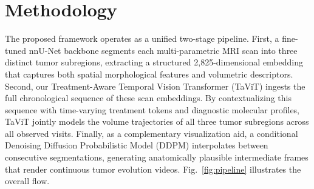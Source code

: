 \documentclass[conference]{IEEEtran}
\begin{document}
\section{Methodology}
\label{sec:methodology}

The proposed framework operates as a unified two-stage pipeline. First, a fine-tuned nnU-Net backbone segments each multi-parametric MRI scan into three distinct tumor subregions, extracting a structured 2,825-dimensional embedding that captures both spatial morphological features and volumetric descriptors. Second, our Treatment-Aware Temporal Vision Transformer (TaViT) ingests the full chronological sequence of these scan embeddings. By contextualizing this sequence with time-varying treatment tokens and diagnostic molecular profiles, TaViT jointly models the volume trajectories of all three tumor subregions across all observed visits. Finally, as a complementary visualization aid, a conditional Denoising Diffusion Probabilistic Model (DDPM) interpolates between consecutive segmentations, generating anatomically plausible intermediate frames that render continuous tumor evolution videos. Fig.~\ref{fig:pipeline} illustrates the overall flow.
\end{document}
